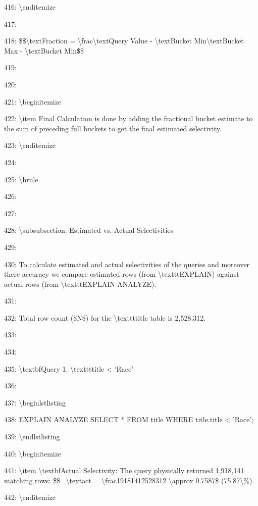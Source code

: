 \documentclass[11pt,a4paper]{article}
\begin{document}
{416: \textbackslash{}end{itemize}

417:

418: \$\$\textbackslash{}text{Fraction} = \textbackslash{}frac{\textbackslash{}text{Query Value} - \textbackslash{}text{Bucket Min}}{\textbackslash{}text{Bucket Max} - \textbackslash{}text{Bucket Min}}\$\$

419:

420:

421: \textbackslash{}begin{itemize}

422: \textbackslash{}item   Final Calculation is done by adding the fractional bucket estimate to the sum of preceding full buckets to get the final estimated selectivity.

423: \textbackslash{}end{itemize}

424:

425: \textbackslash{}hrule

426:

427:

428: \textbackslash{}subsubsection{: Estimated vs. Actual Selectivities}

429:

430: To calculate estimated and actual selectivities of the queries and moreover there accuracy we compare estimated rows (from \textbackslash{}texttt{EXPLAIN}) against actual rows (from \textbackslash{}texttt{EXPLAIN ANALYZE}).

431:

432: Total row count (\$N\$) for the \textbackslash{}texttt{title} table is 2,528,312.

433:

434:

435: \textbackslash{}textbf{Query 1: \textbackslash{}texttt{title < 'Race'}}

436:

437: \textbackslash{}begin{lstlisting}

438: EXPLAIN ANALYZE SELECT * FROM title WHERE title.title < 'Race';

439: \textbackslash{}end{lstlisting}

440: \textbackslash{}begin{itemize}

441: \textbackslash{}item \textbackslash{}textbf{Actual Selectivity:} The query physically returned 1,918,141 matching rows: \$S\_{\textbackslash{}text{act}} = \textbackslash{}frac{1918141}{2528312} \textbackslash{}approx 0.7587\$ (75.87\textbackslash{}\%).

442: \textbackslash{}end{itemize}

}
\end{document}
